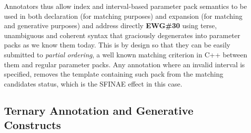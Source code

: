 \p Annotators thus allow index and interval-based parameter pack semantics to be used in both declaration (for matching purposes) and expansion (for matching and generative purposes) and address directly \textbf{EWG\#30} \cite{Abrahams2012} using terse, unambiguous and coherent syntax that graciously degenerates into parameter packs as we know them today.
This is by design so that they can be easily submitted to \textit{partial ordering}, a well known matching criterion in C++ between them and regular parameter packs.
Any annotation where an invalid interval is specified, removes the template containing such pack from the matching candidates status, which is the SFINAE \cite{sfinae} effect in this case.

\subsection{Ternary Annotation and Generative Constructs}
    
        
